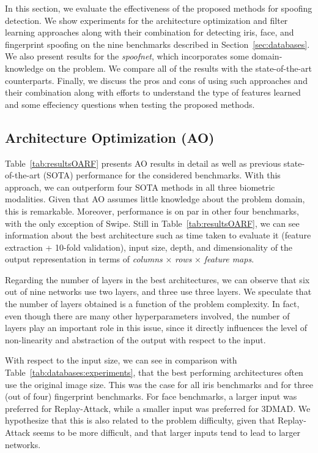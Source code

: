 In this section, we evaluate the effectiveness of the proposed methods for spoofing detection. We show experiments for the architecture optimization and filter learning approaches along with their combination  
for detecting iris, face, and fingerprint spoofing on the nine benchmarks described in Section~\ref{sec:databases}. We also present results for the \emph{spoofnet}, which incorporates some domain-knowledge on the problem. We compare all of the results with the state-of-the-art counterparts. Finally, we discuss the pros and cons of using such approaches and their combination along with efforts to understand the type of features learned and some effeciency questions when testing the proposed methods.



\subsection{Architecture Optimization (AO)}

Table~\ref{tab:resultsOARF} presents AO results in detail as well as previous state-of-the-art (SOTA) performance for the considered benchmarks. With this approach, we can outperform four SOTA methods in all three biometric modalities. Given that AO assumes little knowledge about the problem domain, this is remarkable. Moreover, performance is on par in other four benchmarks, with the only exception of Swipe. Still in Table~\ref{tab:resultsOARF}, we can see information about the best architecture such as time taken to evaluate it (feature extraction + 10-fold validation), input size, depth, and dimensionality of the output representation in terms of \emph{columns} $\times$ \emph{rows} $\times$ \emph{feature maps}.

Regarding the number of layers in the best architectures, we can observe that six out of nine networks use two layers, and three use three layers. We speculate that the number of layers obtained is a function of the problem complexity.
In fact, even though there are many other hyperparameters involved, the number of layers play an important role in this issue, since it directly influences the level of non-linearity and abstraction of the output with respect to the input.

With respect to the input size, we can see in comparison with Table~\ref{tab:databases:experiments}, that the best performing architectures often use the original image size. This was the case for all iris benchmarks and for three (out of four) fingerprint benchmarks. For face benchmarks, a larger input was preferred for Replay-Attack, while a smaller input was preferred for 3DMAD. We hypothesize that this is also related to the problem difficulty, given that Replay-Attack seems to be more difficult, and that larger inputs tend to lead to larger networks.

